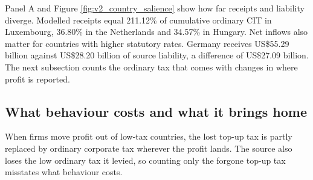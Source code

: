 \documentclass[11pt,a4paper]{article}
\newcommand{\usd}{US\$}
\begin{document}
Panel A and Figure \ref{fig:v2_country_salience} show how far receipts and liability diverge. Modelled receipts equal 211.12\% of cumulative ordinary CIT in Luxembourg, 36.80\% in the Netherlands and 34.57\% in Hungary. Net inflows also matter for countries with higher statutory rates. Germany receives \usd55.29 billion against \usd28.20 billion of source liability, a difference of \usd27.09 billion. The next subsection counts the ordinary tax that comes with changes in where profit is reported.

\subsection{What behaviour costs and what it brings home}\label{sec:cit_recovery}

When firms move profit out of low-tax countries, the lost top-up tax is partly replaced by ordinary corporate tax wherever the profit lands. The source also loses the low ordinary tax it levied, so counting only the forgone top-up tax misstates what behaviour costs.
\end{document}
